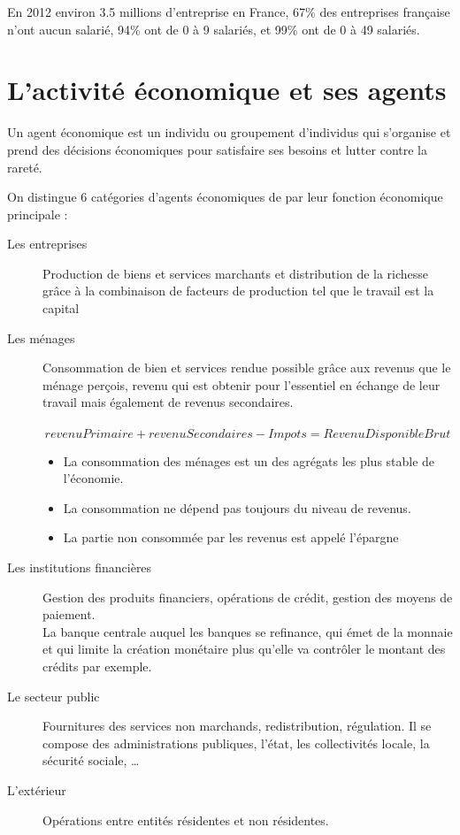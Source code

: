 \documentclass[12pt,a4paper,openany]{book}
\begin{document}
	En 2012 environ 3.5 millions d'entreprise en France, 67\% des entreprises française n'ont aucun salarié, 94\% ont de 0 à 9 salariés, et 99\% ont de
	0 à 49 salariés.

	\section{L'activité économique et ses agents}
	\begin{definition}
		Un agent économique est un individu ou groupement d'individus qui s'organise et prend des décisions économiques pour satisfaire ses besoins et
		lutter contre la rareté.
	\end{definition}

	On distingue 6 catégories d'agents économiques de par leur fonction économique principale : 
	\begin{description}
		\item[Les entreprises]Production de biens et services marchants et distribution de la richesse grâce à la combinaison de facteurs de
			production tel que le travail est la capital
		\item[Les ménages] Consommation de bien et services rendue possible grâce aux revenus que le ménage perçois, revenu qui est obtenir pour
			l'essentiel en échange de leur travail mais également de revenus secondaires.\\~
			$$revenuPrimaire + revenuSecondaires - Impots = RevenuDisponibleBrut$$

			\begin{remarque}
				\begin{itemize}
					\item La consommation des ménages est un des agrégats les plus stable de l'économie.
					\item La consommation ne dépend pas toujours du niveau de revenus.
					\item La partie non consommée par les revenus est appelé l'épargne
				\end{itemize}
			\end{remarque}
		\item[Les institutions financières] Gestion des produits financiers, opérations de crédit, gestion des moyens de paiement.\\
			La banque centrale auquel les banques se refinance, qui émet de la monnaie et qui limite la création monétaire plus qu'elle va contrôler le
			montant des crédits par exemple.
		\item[Le secteur public] Fournitures des services non marchands, redistribution, régulation. Il se compose des administrations publiques,
			l'état, les collectivités locale, la sécurité sociale, \ldots 
		\item[L'extérieur] Opérations entre entités résidentes et non résidentes.
	\end{description}
\end{document}
